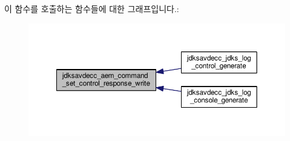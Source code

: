 이 함수를 호출하는 함수들에 대한 그래프입니다.\+:
\nopagebreak
\begin{figure}[H]
\begin{center}
\leavevmode
\includegraphics[width=350pt]{group__command__set__control__response_ga1baf427e932ebec21bb6bc41e2fb4d74_icgraph}
\end{center}
\end{figure}


